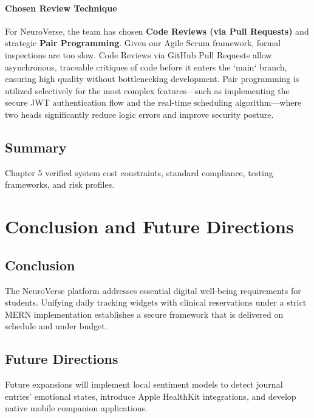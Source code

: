 \documentclass[a4paper,11pt]{report}
\begin{document}
\subsubsection{Chosen Review Technique}
For NeuroVerse, the team has chosen \textbf{Code Reviews (via Pull Requests)} and strategic \textbf{Pair Programming}. 
Given our Agile Scrum framework, formal inspections are too slow. Code Reviews via GitHub Pull Requests allow asynchronous, traceable critiques of code before it enters the `main` branch, ensuring high quality without bottlenecking development. Pair programming is utilized selectively for the most complex features—such as implementing the secure JWT authentication flow and the real-time scheduling algorithm—where two heads significantly reduce logic errors and improve security posture.

\section{Summary}
Chapter 5 verified system cost constraints, standard compliance, testing frameworks, and risk profiles.

\chapter{Conclusion and Future Directions}

\section{Conclusion}
The NeuroVerse platform addresses essential digital well-being requirements for students. Unifying daily tracking widgets with clinical reservations under a strict MERN implementation establishes a secure framework that is delivered on schedule and under budget.

\section{Future Directions}
Future expansions will implement local sentiment models to detect journal entries' emotional states, introduce Apple HealthKit integrations, and develop native mobile companion applications.

\let\clearpage\origclearpage
\let\cleardoublepage\origcleardoublepage
\clearpage
\end{document}
